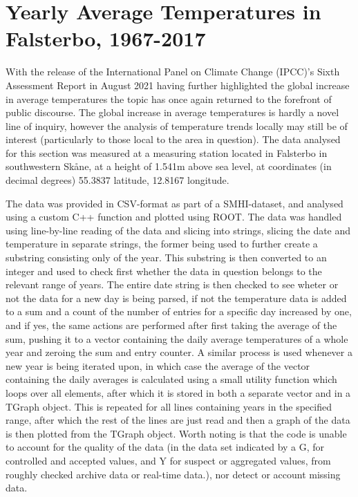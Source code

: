 \section{Yearly Average Temperatures in Falsterbo, 1967-2017}

With the release of the International Panel on Climate Change (IPCC)'s Sixth Assessment Report\cite{IPCC} in August 2021 having further highlighted the global increase in average temperatures the topic has once again returned to the forefront of public discourse. The global increase in average temperatures is hardly a novel line of inquiry, however the analysis of temperature trends locally may still be of interest (particularly to those local to the area in question). The data analysed for this section was measured at a measuring station located in Falsterbo in southwestern Skåne, at a height of 1.541m above sea level, at coordinates (in decimal degrees) 55.3837 latitude, 12.8167 longitude.


The data was provided in CSV-format as part of a SMHI-dataset, and analysed using a custom C++ function and plotted using ROOT. The data was handled using line-by-line reading of the data and slicing into strings, slicing the date and temperature in separate strings, the former being used to further create a substring consisting only of the year. This substring is then converted to an integer and used to check first whether the data in question belongs to the relevant range of years. The entire date string is then checked to see wheter or not the data for a new day is being parsed, if not the temperature data is added to a sum and a count of the number of entries for a specific day increased by one, and if yes, the same actions are performed after first taking the average of the sum, pushing it to a vector containing the daily average temperatures of a whole year and zeroing the sum and entry counter. A similar process is used whenever a new year is being iterated upon, in which case the average of the vector containing the daily averages is calculated using a small utility function which loops over all elements, after which it is stored in both a separate vector and in a TGraph object. This is repeated for all lines containing years in the specified range, after which the rest of the lines are just read and then a graph of the data is then plotted from the TGraph object. Worth noting is that the code is unable to account for the quality of the data (in the data set indicated by a G, for controlled and accepted values, and Y for suspect or aggregated values, from roughly checked archive data or real-time data.), nor detect or account missing data.

